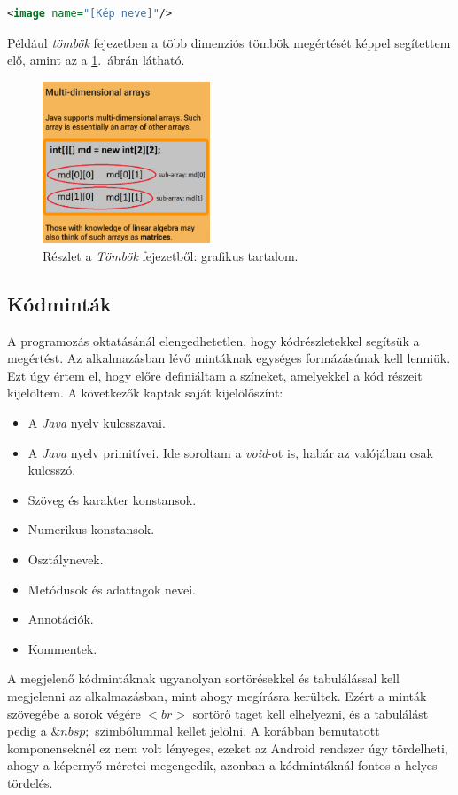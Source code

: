 \documentclass[12pt,a4paper]{article}
\begin{document}
	\bigskip
	\begin{lstlisting}[language=XML]
<image name="[Kép neve]"/>
	\end{lstlisting}
	
	Például \textit{tömbök} fejezetben a több dimenziós tömbök megértését képpel segítettem elő, amint az a \ref{image_component_figure}.\ ábrán látható.
	
	\begin{figure}
		\centering
		\includegraphics[width=5cm]{image_component}
		\caption{Részlet a \textit{Tömbök} fejezetből: grafikus tartalom.}
		\label{image_component_figure}
	\end{figure}
	
	\subsection{Kódminták} \label{kodmintak}
	
	A programozás oktatásánál elengedhetetlen, hogy kódrészletekkel segítsük a megértést. Az alkalmazásban lévő mintáknak egységes formázásúnak kell lenniük. Ezt úgy értem el, hogy előre definiáltam a színeket, amelyekkel a kód részeit kijelöltem. A következők kaptak saját kijelölőszínt:
	
	\begin{itemize}
		\item A \textit{Java} nyelv kulcsszavai.
		\item A \textit{Java} nyelv primitívei. Ide soroltam a \textit{void}-ot is, habár az valójában csak kulcsszó.
		\item Szöveg és karakter konstansok.
		\item Numerikus konstansok.
		\item Osztálynevek.
		\item Metódusok és adattagok nevei.
		\item Annotációk.
		\item Kommentek. 
	\end{itemize}
	
	A megjelenő kódmintáknak ugyanolyan sortörésekkel és tabulálással kell megjelenni az alkalmazásban, mint ahogy megírásra kerültek. Ezért a minták szövegébe a sorok végére $<br>$ sortörő taget kell elhelyezni, és a tabulálást pedig a $\&nbsp;$ szimbólummal kellet jelölni. A korábban bemutatott komponenseknél ez nem volt lényeges, ezeket az Android rendszer úgy tördelheti, ahogy a képernyő méretei megengedik, azonban a kódmintáknál fontos a helyes tördelés.
	
\end{document}
